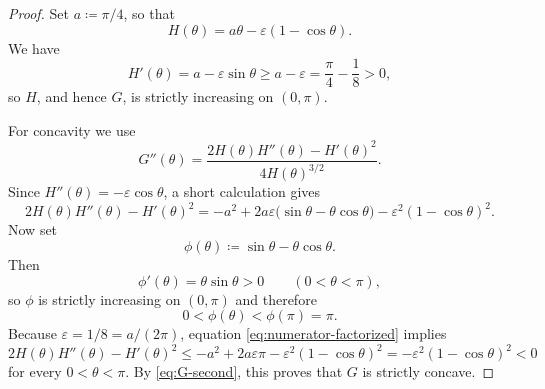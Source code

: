 \documentclass[10pt,a4paper]{amsart}
\begin{document}
\begin{proof}
Set $a\coloneqq\pi/4$, so that
\[
H(\theta)=a\theta-\varepsilon(1-\cos\theta).
\]
We have
\[
H'(\theta)=a-\varepsilon\sin\theta\ge a-\varepsilon=\frac{\pi}{4}-\frac18>0,
\]
so $H$, and hence $G$, is strictly increasing on $(0,\pi)$.

For concavity we use
\begin{equation}\label{eq:G-second}
G''(\theta)=\frac{2H(\theta)H''(\theta)-H'(\theta)^2}{4H(\theta)^{3/2}}.
\end{equation}
Since $H''(\theta)=-\varepsilon\cos\theta$, a short calculation gives
\begin{equation}\label{eq:numerator-factorized}
2H(\theta)H''(\theta)-H'(\theta)^2
=-a^2+2a\varepsilon\bigl(\sin\theta-\theta\cos\theta\bigr)
-\varepsilon^2(1-\cos\theta)^2.
\end{equation}
Now set
\[
\phi(\theta)\coloneqq\sin\theta-\theta\cos\theta.
\]
Then
\[
\phi'(\theta)=\theta\sin\theta>0
\qquad (0<\theta<\pi),
\]
so $\phi$ is strictly increasing on $(0,\pi)$ and therefore
\[
0<\phi(\theta)<\phi(\pi)=\pi.
\]
Because $\varepsilon=1/8=a/(2\pi)$, equation
\eqref{eq:numerator-factorized} implies
\[
2H(\theta)H''(\theta)-H'(\theta)^2
\le -a^2+2a\varepsilon\pi-\varepsilon^2(1-\cos\theta)^2
=-\varepsilon^2(1-\cos\theta)^2<0
\]
for every $0<\theta<\pi$. By \eqref{eq:G-second}, this proves that $G$ is
strictly concave.
\end{proof}
\end{document}
